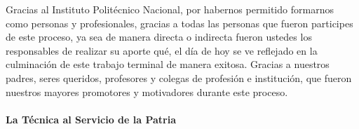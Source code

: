 
\begin{acknowledgements}

Gracias al Instituto Politécnico Nacional, por habernos permitido formarnos como personas y profesionales, gracias a todas las personas que fueron participes de este proceso, ya sea de manera directa o indirecta fueron ustedes los responsables de realizar su aporte qué, el día de hoy se ve reflejado en la culminación de este trabajo terminal de manera exitosa. Gracias a nuestros padres, seres queridos, profesores y colegas de profesión e institución, que fueron nuestros mayores promotores y motivadores durante este proceso.
\\
\\
\textbf{La Técnica al Servicio de la Patria}

\end{acknowledgements}




